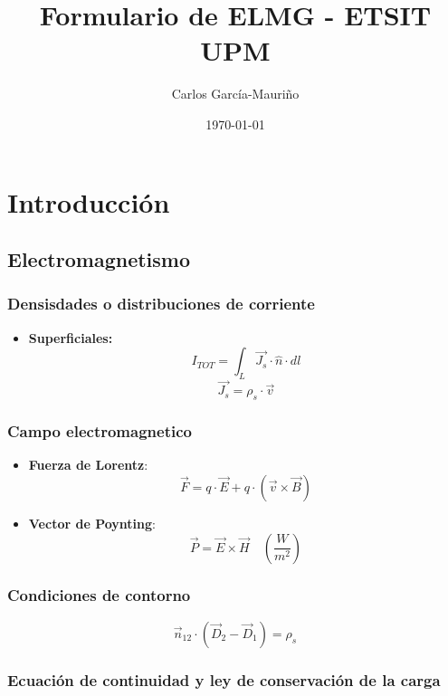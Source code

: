 \documentclass[12pt,a4paper]{article}
\title{Formulario de ELMG - ETSIT UPM}
\author{Carlos García-Mauriño}
\date{\today}
\begin{document}
\maketitle

\twocolumn

\section{Introducción}
\label{sec:introduccion}

\subsection{Electromagnetismo}
\label{sub:electromagnetismo}

\subsubsection{Densisdades o distribuciones de corriente}
\label{ssub:densisdades_o_distribuciones_de_corriente}

\begin{itemize}
		\item \textbf{Superficiales:}
				\[ I_{TOT} = \int_L\vec{J_s} \cdot \hat{n} \cdot dl \]
				\[ \vec{J_s} = \rho_s \cdot \vec{v} \]
\end{itemize}

\subsubsection{Campo electromagnetico}
\label{ssub:campo_electromagnetico}

\begin{itemize}
		\item \textbf{Fuerza de Lorentz}:
				\[ \vec{F} = q \cdot \vec{E} + q \cdot ( \vec{v} \times \vec{B} ) \]
		\item \textbf{Vector de Poynting}:
				\[ \vec{P} = \vec{E} \times \vec{H} \quad \left( \frac{W}{m^2} \right) \]
\end{itemize}

\subsubsection{Condiciones de contorno}
\label{ssub:condiciones_de_contorno}

\[ \vec{n}_{12} \cdot ( \vec{D}_2 - \vec{D}_1 ) = \rho_s \]

\subsubsection{Ecuación de continuidad y ley de conservación de la carga}
\label{ssub:ecuacion_de_continuidad_y_ley_de_conservacion_de_la_carga}
\end{document}
